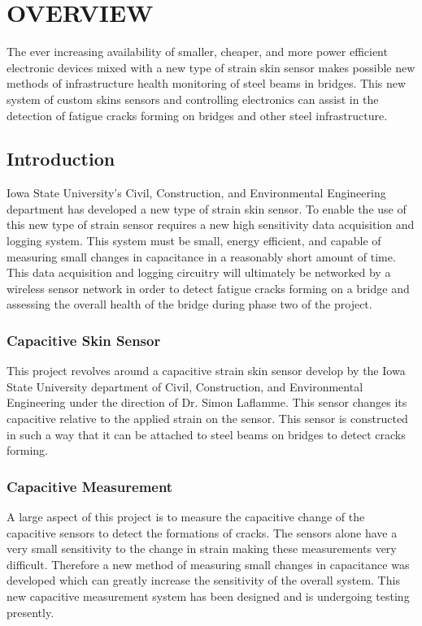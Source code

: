 \chapter{OVERVIEW}

The ever increasing availability of smaller, cheaper, and more power efficient electronic devices mixed with a new type of strain skin sensor makes possible new methods of infrastructure health monitoring of steel beams in bridges.  This new system of custom skins sensors and controlling electronics can assist in the detection of fatigue cracks forming on bridges and other steel infrastructure.

\section{Introduction}

Iowa State University's Civil, Construction, and Environmental Engineering department has developed a new type of strain skin sensor.  To enable the use of this new type of strain sensor requires a new high sensitivity data acquisition and logging system.  This system must be small, energy efficient, and capable of measuring small changes in capacitance in a reasonably short amount of time.  This data acquisition and logging circuitry will ultimately be networked by a wireless sensor network in order to detect fatigue cracks forming on a bridge and assessing the overall health of the bridge during phase two of the project.

\subsection{Capacitive Skin Sensor}
This project revolves around a capacitive strain skin sensor develop by the Iowa State University department of Civil, Construction, and Environmental Engineering under the direction of Dr. Simon Laflamme.  This sensor changes its capacitive relative to the applied strain on the sensor.  This sensor is constructed in such a way that it can be attached to steel beams on bridges to detect cracks forming.

\subsection{Capacitive Measurement}
A large aspect of this project is to measure the capacitive change of the capacitive sensors to detect the formations of cracks.  The sensors alone have a very small sensitivity to the change in strain making these measurements very difficult.  Therefore a new method of measuring small changes in capacitance was developed which can greatly increase the sensitivity of the overall system.  This new capacitive measurement system has been designed and is undergoing testing presently.

